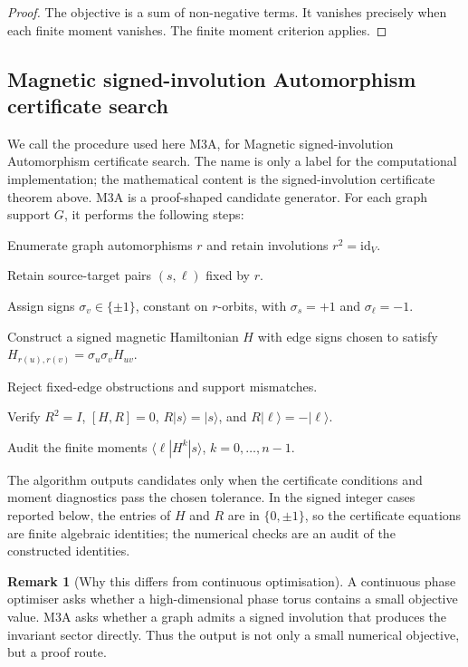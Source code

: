\documentclass[11pt]{article}
\theoremstyle{definition}
\newtheorem{remark}[theorem]{Remark}
\newcommand{\id}{\mathrm{id}}
\begin{document}
\begin{proof}
The objective is a sum of non-negative terms. It vanishes precisely when each finite moment vanishes. The finite moment criterion applies.
\end{proof}

\subsection{Magnetic signed-involution Automorphism certificate search}
We call the procedure used here M3A, for Magnetic signed-involution Automorphism certificate search. The name is only a label for the computational implementation; the mathematical content is the signed-involution certificate theorem above. M3A is a proof-shaped candidate generator. For each graph support $G$, it performs the following steps:

\begin{description}[leftmargin=3.5em,style=nextline]
\item[M3A.1] Enumerate graph automorphisms $r$ and retain involutions $r^2=\id_V$.
\item[M3A.2] Retain source-target pairs $(s,\ell)$ fixed by $r$.
\item[M3A.3] Assign signs $\sigma_v\in\{\pm1\}$, constant on $r$-orbits, with $\sigma_s=+1$ and $\sigma_\ell=-1$.
\item[M3A.4] Construct a signed magnetic Hamiltonian $H$ with edge signs chosen to satisfy $H_{r(u),r(v)}=\sigma_u\sigma_vH_{uv}$.
\item[M3A.5] Reject fixed-edge obstructions and support mismatches.
\item[M3A.6] Verify $R^2=I$, $[H,R]=0$, $R|s\rangle=|s\rangle$, and $R|\ell\rangle=-|\ell\rangle$.
\item[M3A.7] Audit the finite moments $\langle \ell|H^k|s\rangle$, $k=0,\ldots,n-1$.
\end{description}

The algorithm outputs candidates only when the certificate conditions and moment diagnostics pass the chosen tolerance. In the signed integer cases reported below, the entries of $H$ and $R$ are in $\{0,\pm1\}$, so the certificate equations are finite algebraic identities; the numerical checks are an audit of the constructed identities.

\begin{remark}[Why this differs from continuous optimisation]
A continuous phase optimiser asks whether a high-dimensional phase torus contains a small objective value. M3A asks whether a graph admits a signed involution that produces the invariant sector directly. Thus the output is not only a small numerical objective, but a proof route.
\end{remark}
\end{document}
